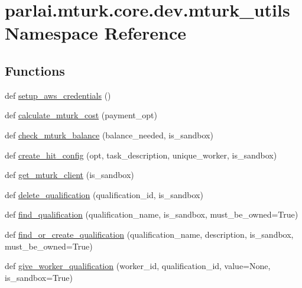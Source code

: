 \hypertarget{namespaceparlai_1_1mturk_1_1core_1_1dev_1_1mturk__utils}{}\section{parlai.\+mturk.\+core.\+dev.\+mturk\+\_\+utils Namespace Reference}
\label{namespaceparlai_1_1mturk_1_1core_1_1dev_1_1mturk__utils}
\subsection*{Functions}
\begin{DoxyCompactItemize}
\item 
def \hyperlink{namespaceparlai_1_1mturk_1_1core_1_1dev_1_1mturk__utils_a086d7381c328214587d3ec28bbcd19ab}{setup\+\_\+aws\+\_\+credentials} ()
\item 
def \hyperlink{namespaceparlai_1_1mturk_1_1core_1_1dev_1_1mturk__utils_ab0dab541f46c0b18e96bcbbb536bddf6}{calculate\+\_\+mturk\+\_\+cost} (payment\+\_\+opt)
\item 
def \hyperlink{namespaceparlai_1_1mturk_1_1core_1_1dev_1_1mturk__utils_af89757251500a96195029eb22e58e516}{check\+\_\+mturk\+\_\+balance} (balance\+\_\+needed, is\+\_\+sandbox)
\item 
def \hyperlink{namespaceparlai_1_1mturk_1_1core_1_1dev_1_1mturk__utils_aad5b4cc1ff4815272164f620b952d037}{create\+\_\+hit\+\_\+config} (opt, task\+\_\+description, unique\+\_\+worker, is\+\_\+sandbox)
\item 
def \hyperlink{namespaceparlai_1_1mturk_1_1core_1_1dev_1_1mturk__utils_ad9e4ecfca00663796f26ca16a2778f29}{get\+\_\+mturk\+\_\+client} (is\+\_\+sandbox)
\item 
def \hyperlink{namespaceparlai_1_1mturk_1_1core_1_1dev_1_1mturk__utils_a1a4243aaafd94de8087e0d6ae06ad45c}{delete\+\_\+qualification} (qualification\+\_\+id, is\+\_\+sandbox)
\item 
def \hyperlink{namespaceparlai_1_1mturk_1_1core_1_1dev_1_1mturk__utils_acd636315cbbf11cc5d9d641173e51586}{find\+\_\+qualification} (qualification\+\_\+name, is\+\_\+sandbox, must\+\_\+be\+\_\+owned=True)
\item 
def \hyperlink{namespaceparlai_1_1mturk_1_1core_1_1dev_1_1mturk__utils_ab4c0dfc58f9fe37c28c9d23628d1de4e}{find\+\_\+or\+\_\+create\+\_\+qualification} (qualification\+\_\+name, description, is\+\_\+sandbox, must\+\_\+be\+\_\+owned=True)
\item 
def \hyperlink{namespaceparlai_1_1mturk_1_1core_1_1dev_1_1mturk__utils_a631fbce36ff4d09422f29513460bc744}{give\+\_\+worker\+\_\+qualification} (worker\+\_\+id, qualification\+\_\+id, value=None, is\+\_\+sandbox=True)

\end{DoxyCompactItemize}
